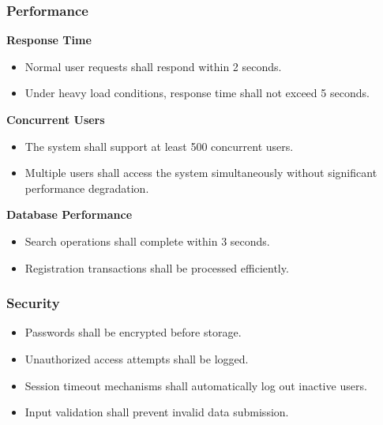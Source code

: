 
\subsubsection{Performance}

\textbf{Response Time}

\begin{itemize}
    \item Normal user requests shall respond within 2 seconds.
    
    \item Under heavy load conditions, response time shall not exceed 5 seconds.
\end{itemize}

\textbf{Concurrent Users}

\begin{itemize}
    \item The system shall support at least 500 concurrent users.
    
    \item Multiple users shall access the system simultaneously without significant performance degradation.
\end{itemize}

\textbf{Database Performance}

\begin{itemize}
    \item Search operations shall complete within 3 seconds.
    
    \item Registration transactions shall be processed efficiently.
\end{itemize}


\subsubsection{Security}

\begin{itemize}
    \item Passwords shall be encrypted before storage.
    
    \item Unauthorized access attempts shall be logged.
    
    \item Session timeout mechanisms shall automatically log out inactive users.
    
    \item Input validation shall prevent invalid data submission.
\end{itemize}


